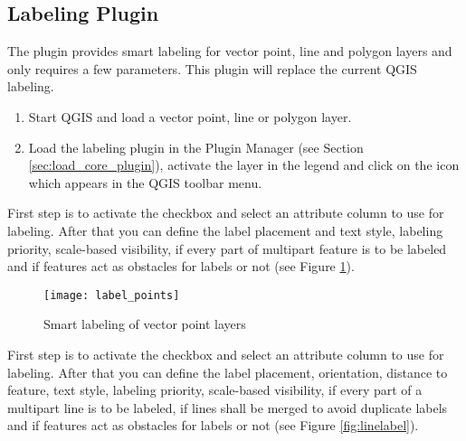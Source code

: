 
\subsection{Labeling Plugin}


The  plugin provides smart labeling for vector point, 
line and polygon layers and only requires a few parameters. This plugin will replace 
the current QGIS labeling. 

\begin{enumerate}
  \item Start QGIS and load a vector point, line or polygon layer. 
  \item Load the labeling plugin in the Plugin Manager (see Section 
  \ref{sec:load_core_plugin}), activate the layer in the legend and click on the 
   icon which appears in the QGIS toolbar menu.
\end{enumerate}


First step is to activate the  checkbox and select an attribute 
column to use for labeling. After that you can define the label placement and text style, 
labeling priority, scale-based visibility, if every part of multipart feature is to be 
labeled and if features act as obstacles for labels or not (see Figure \ref{fig:pointlabel}).  

\begin{figure}[ht]
\begin{center}
   \caption{Smart labeling of vector point layers \nixcaption}\label{fig:pointlabel}\smallskip
   \texttt{[image: label\_points]}
\end{center}
\end{figure}


First step is to activate the  checkbox and select an attribute
column to use for labeling. After that you can define the label placement, orientation, 
distance to feature, text style, labeling priority, scale-based visibility, if every part 
of a multipart line is to be labeled, if lines shall be merged to avoid duplicate labels 
and if features act as obstacles for labels or not (see Figure \ref{fig:linelabel}).

